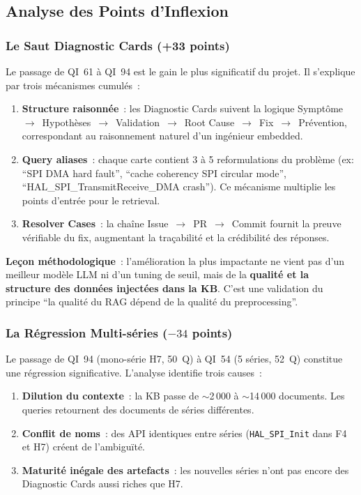 \subsection{Analyse des Points d'Inflexion}
\label{sec:points_inflexion}

\subsubsection{Le Saut Diagnostic Cards (+33 points)}

Le passage de QI~61 à QI~94 est le gain le plus significatif du projet. Il s'explique par trois mécanismes cumulés~:

\begin{enumerate}
  \item \textbf{Structure raisonnée}~: les Diagnostic Cards suivent la logique Symptôme~$\to$~Hypothèses~$\to$~Validation~$\to$~Root Cause~$\to$~Fix~$\to$~Prévention, correspondant au raisonnement naturel d'un ingénieur embedded.
  \item \textbf{Query aliases}~: chaque carte contient 3 à 5 reformulations du problème (ex: ``SPI DMA hard fault'', ``cache coherency SPI circular mode'', ``HAL\_SPI\_TransmitReceive\_DMA crash''). Ce mécanisme multiplie les points d'entrée pour le retrieval.
  \item \textbf{Resolver Cases}~: la chaîne Issue~$\to$~PR~$\to$~Commit fournit la preuve vérifiable du fix, augmentant la traçabilité et la crédibilité des réponses.
\end{enumerate}

\textbf{Leçon méthodologique}~: l'amélioration la plus impactante ne vient pas d'un meilleur modèle LLM ni d'un tuning de seuil, mais de la \textbf{qualité et la structure des données injectées dans la KB}. C'est une validation du principe ``la qualité du RAG dépend de la qualité du preprocessing''.

\subsubsection{La Régression Multi-séries ($-34$ points)}

Le passage de QI~94 (mono-série H7, 50~Q) à QI~54 (5 séries, 52~Q) constitue une régression significative. L'analyse identifie trois causes~:

\begin{enumerate}
  \item \textbf{Dilution du contexte}~: la KB passe de $\sim$2\,000 à $\sim$14\,000 documents. Les queries retournent des documents de séries différentes.
  \item \textbf{Conflit de noms}~: des API identiques entre séries (\texttt{HAL\_SPI\_Init} dans F4 et H7) créent de l'ambiguïté.
  \item \textbf{Maturité inégale des artefacts}~: les nouvelles séries n'ont pas encore des Diagnostic Cards aussi riches que H7.
\end{enumerate}

